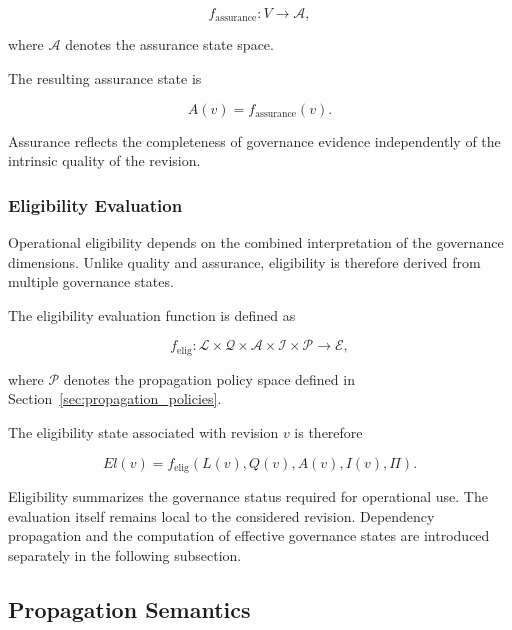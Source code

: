 \documentclass[10pt]{article}
\begin{document}
	\begin{equation}
		f_{\mathrm{assurance}} : V \rightarrow \mathcal{A},
		\label{eq:f_assurance}
	\end{equation}
	
	where $\mathcal{A}$ denotes the assurance state space.
	
	The resulting assurance state is
	
	\begin{equation}
		A(v)=f_{\mathrm{assurance}}(v).
		\label{eq:assurance_assignment}
	\end{equation}
	
	Assurance reflects the completeness of governance evidence independently of the intrinsic quality of the revision.
	
	\subsubsection{Eligibility Evaluation}
	
	Operational eligibility depends on the combined interpretation of the governance dimensions. Unlike quality and assurance, eligibility is therefore derived from multiple governance states.
	
	The eligibility evaluation function is defined as
	
	\begin{equation}
		f_{\mathrm{elig}} :
		\mathcal{L}
		\times
		\mathcal{Q}
		\times
		\mathcal{A}
		\times
		\mathcal{I}
		\times
		\mathcal{P}
		\rightarrow
		\mathcal{E},
		\label{eq:f_elig}
	\end{equation}
	
	where $\mathcal{P}$ denotes the propagation policy space defined in Section~\ref{sec:propagation_policies}.
	
	The eligibility state associated with revision $v$ is therefore
	
	\begin{equation}
		El(v)=
		f_{\mathrm{elig}}
		\left(
		L(v),
		Q(v),
		A(v),
		I(v),
		\Pi
		\right).
		\label{eq:eligibility_assignment}
	\end{equation}
	
	Eligibility summarizes the governance status required for operational use. The evaluation itself remains local to the considered revision. Dependency propagation and the computation of effective governance states are introduced separately in the following subsection.
	
	\subsection{Propagation Semantics}
	\label{subsec:propagation_semantics}
	
\end{document}

